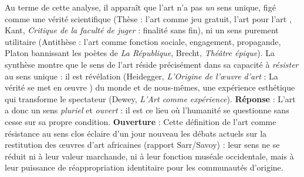 \documentclass[11pt]{article}
\newcommand{\cle}[1]{{\popxbold\color{popdark}#1}}
\begin{document}
\begin{exoresolu}
    Au terme de cette analyse, il apparaît que l'art n'a pas \emph{un} sens unique, figé comme une vérité scientifique (Thèse : l'art comme \cle{jeu} gratuit, \guillemotleft l'art pour l'art \guillemotright, Kant, \emph{Critique de la faculté de juger} : \cle{finalité sans fin}), ni un sens purement utilitaire (Antithèse : l'art comme \cle{fonction sociale}, engagement, propagande, Platon bannissant les poètes de \emph{La République}, Brecht, \emph{Théâtre épique}). La synthèse montre que le \cle{sens de l'art} réside précisément dans sa capacité à \emph{résister} au sens unique : il est \cle{révélation} (Heidegger, \emph{L'Origine de l'œuvre d'art} : \guillemotleft La vérité se met en œuvre \guillemotright) du monde et de nous-mêmes, une \cle{expérience esthétique} qui transforme le spectateur (Dewey, \emph{L'Art comme expérience}). \textbf{Réponse} : L'art a donc un sens \emph{pluriel} et \emph{ouvert} : il est ce lieu où l'humanité se questionne sans cesse sur sa propre condition. \textbf{Ouverture} : Cette définition de l'art comme \cle{résistance au sens clos} éclaire d'un jour nouveau les débats actuels sur la \cle{restitution des œuvres d'art africaines} (rapport Sarr/Savoy) : leur \guillemotleft sens \guillemotright ne se réduit ni à leur valeur marchande, ni à leur fonction muséale occidentale, mais à leur puissance de \cle{réappropriation identitaire} pour les communautés d'origine.
\end{exoresolu}
\end{document}
